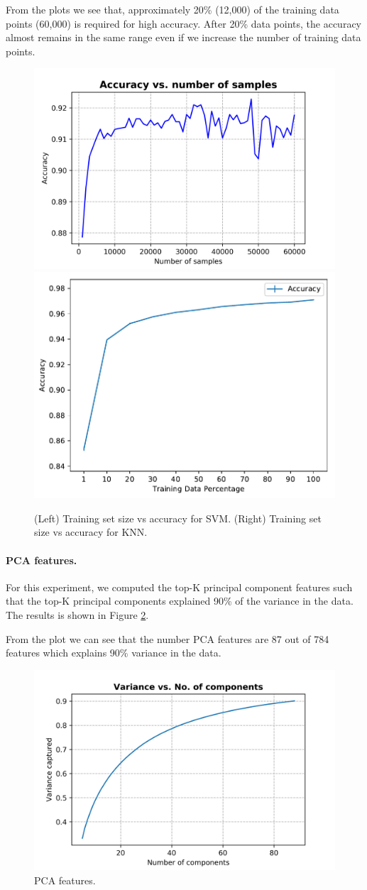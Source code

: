 \documentclass[10pt]{scrartcl}
\begin{document}
From the plots we see that, approximately 20\% (12,000) of the training data points (60,000) is required for high accuracy. After 20\% data points, the accuracy 
almost remains in the same range even if we increase the number of training data points.
\begin{figure}
\centering
\includegraphics[width=0.5\linewidth]{figures/accuracy_vs_samples_linearsvm_default.png}%
\includegraphics[width=0.45\linewidth]{figures/KNN_accuracy_vs_tss_with_fixed_k.pdf}%
\caption{(Left) Training set size vs accuracy for SVM. (Right) Training set size vs accuracy for KNN. \label{fig:svm_knn_accuracy_tss}}
\end{figure}

\paragraph{PCA features.}
For this experiment, we computed the top-K principal component features such that the top-K principal components explained 90\% of the variance in the data. 
The results is shown in Figure \ref{fig:pca_features}.

From the plot we can see that the number PCA features are 87 out of 784 features which explains 90\% variance in the data.
\begin{figure}
\centering
\includegraphics[width=0.5\linewidth]{figures/pca_variance_vs_no_comp.png}
\caption{PCA features. \label{fig:pca_features}}
\end{figure}
\end{document}
